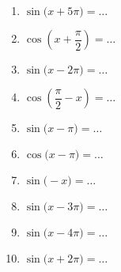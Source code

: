 \documentclass[11pt]{article}
\begin{document}
\begin{exercice}

\begin{multicols}{2}
\begin{enumerate}[itemsep=1em]
	\item \begin{minipage}[t]{\linewidth} $\sin\big(x+5\pi\big)=$$\ldots$ \end{minipage}
	\item \begin{minipage}[t]{\linewidth} $\cos\left(x+\dfrac{\pi}{2}\right)=$$\ldots$ \end{minipage}
	\item \begin{minipage}[t]{\linewidth} $\sin\big(x-2\pi\big)=$$\ldots$ \end{minipage}
	\item \begin{minipage}[t]{\linewidth} $\cos\left(\dfrac{\pi}{2}-x\right)=$$\ldots$ \end{minipage}
	\item \begin{minipage}[t]{\linewidth} $\sin\big(x-\pi\big)=$$\ldots$ \end{minipage}
	\item \begin{minipage}[t]{\linewidth} $\cos\big(x-\pi\big)=$$\ldots$ \end{minipage}
	\item \begin{minipage}[t]{\linewidth} $\sin\big(-x\big)=$$\ldots$ \end{minipage}
	\item \begin{minipage}[t]{\linewidth} $\sin\big(x-3\pi\big)=$$\ldots$ \end{minipage}
	\item \begin{minipage}[t]{\linewidth} $\sin\big(x-4\pi\big)=$$\ldots$ \end{minipage}
	\item \begin{minipage}[t]{\linewidth} $\sin\big(x+2\pi\big)=$$\ldots$ \end{minipage}
\end{enumerate}
\end{multicols}
\end{exercice}
\end{document}
